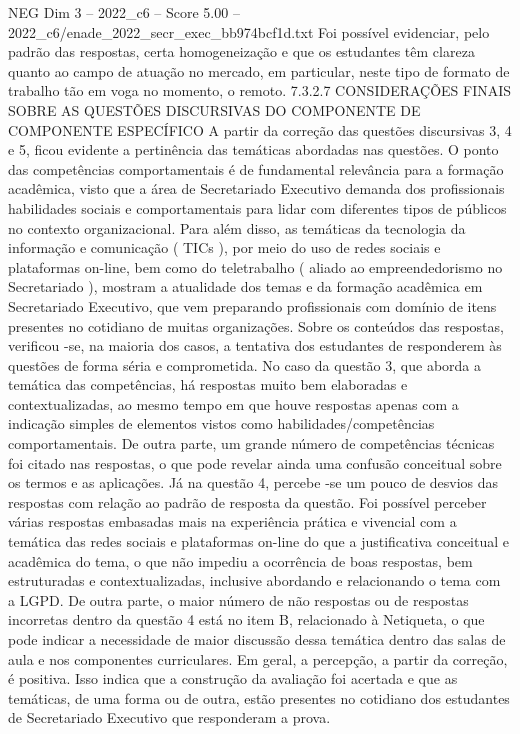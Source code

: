 \begin{textsample}{NEG Dim 3 – 2022\_c6 – Score 5.00 – 2022\_c6/enade\_2022\_secr\_exec\_bb974bcf1d.txt}
Foi possível evidenciar, pelo padrão das respostas, certa homogeneização e que os estudantes têm clareza quanto ao campo de atuação no mercado, em particular, neste tipo de formato de trabalho tão em voga no momento, o remoto. 7.3.2.7 CONSIDERAÇÕES FINAIS SOBRE AS QUESTÕES DISCURSIVAS DO COMPONENTE DE COMPONENTE ESPECÍFICO A partir da correção das questões discursivas 3, 4 e 5, ficou evidente a pertinência das temáticas abordadas nas questões.
O ponto das competências comportamentais é de fundamental relevância para a formação acadêmica, visto que a área de Secretariado Executivo demanda dos profissionais habilidades sociais e comportamentais para lidar com diferentes tipos de públicos no contexto organizacional.
Para além disso, as temáticas da tecnologia da informação e comunicação ( TICs ), por meio do uso de redes sociais e plataformas on-line, bem como do teletrabalho ( aliado ao empreendedorismo no Secretariado ), mostram a atualidade dos temas e da formação acadêmica em Secretariado Executivo, que vem preparando profissionais com domínio de itens presentes no cotidiano de muitas organizações.
Sobre os conteúdos das respostas, verificou -se, na maioria dos casos, a tentativa dos estudantes de responderem às questões de forma séria e comprometida.
No caso da questão 3, que aborda a temática das competências, há respostas muito bem elaboradas e contextualizadas, ao mesmo tempo em que houve respostas apenas com a indicação simples de elementos vistos como habilidades/competências comportamentais.
De outra parte, um grande número de competências técnicas foi citado nas respostas, o que pode revelar ainda uma confusão conceitual sobre os termos e as aplicações.
Já na questão 4, percebe -se um pouco de desvios das respostas com relação ao padrão de resposta da questão.
Foi possível perceber várias respostas embasadas mais na experiência prática e vivencial com a temática das redes sociais e plataformas on-line do que a justificativa conceitual e acadêmica do tema, o que não impediu a ocorrência de boas respostas, bem estruturadas e contextualizadas, inclusive abordando e relacionando o tema com a LGPD.
De outra parte, o maior número de não respostas ou de respostas incorretas dentro da questão 4 está no item B, relacionado à Netiqueta, o que pode indicar a necessidade de maior discussão dessa temática dentro das salas de aula e nos componentes curriculares.
Em geral, a percepção, a partir da correção, é positiva.
Isso indica que a construção da avaliação foi acertada e que as temáticas, de uma forma ou de outra, estão presentes no cotidiano dos estudantes de Secretariado Executivo que responderam a prova.

\end{textsample}
